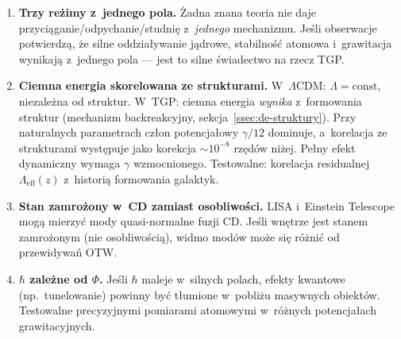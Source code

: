 \medskip
\begin{enumerate}[nosep]
  \item \textbf{Trzy re\.zimy z~jednego pola.}
        \.Zadna znana teoria nie daje
        przyci\k{a}ganie/odpychanie/studni\k{e} z~\emph{jednego}
        mechanizmu. Je\'sli obserwacje potwierdzą, \.ze silne
        oddzia\l{}ywanie j\k{a}drowe, stabilno\'s\'c atomowa
        i~grawitacja wynikaj\k{a} z~jednego pola --- jest to
        silne \'swiadectwo na rzecz TGP.

  \item \textbf{Ciemna energia skorelowana ze strukturami.}
        W~$\Lambda$CDM: $\Lambda = \mathrm{const}$, niezale\.zna
        od struktur. W~TGP: ciemna energia \emph{wynika}
        z~formowania struktur (mechanizm backreakcyjny,
        sekcja~\ref{ssec:de-struktury}). Przy naturalnych parametrach
        cz\l{}on potencja\l{}owy $\gamma/12$ dominuje, a~korelacja
        ze strukturami wyst\k{e}puje jako korekcja
        $\sim 10^{-8}$ rz\k{e}d\'ow ni\.zej. Pe\l{}ny efekt
        dynamiczny wymaga $\gamma$ wzmocnionego.
        Testowalne: korelacja residualnej
        $\Lambda_{\mathrm{eff}}(z)$ z~histori\k{a} formowania
        galaktyk.

  \item \textbf{Stan zamro\.zony w~CD zamiast osobliwo\'sci.}
        LISA i~Einstein Telescope mog\k{a} mierzy\'c mody
        quasi-normalne fuzji CD. Je\'sli wn\k{e}trze jest
        stanem zamro\.zonym (nie osobliwo\'sci\k{a}), widmo
        mod\'ow mo\.ze si\k{e} r\'o\.zni\'c od przewidywa\'n OTW.

  \item \textbf{$\hbar$ zale\.zne od $\Phi$.}
        Je\'sli $\hbar$ maleje w~silnych polach, efekty kwantowe
        (np.\ tunelowanie) powinny by\'c t\l{}umione w~pobli\.zu
        masywnych obiekt\'ow. Testowalne precyzyjnymi
        pomiarami atomowymi w~r\'o\.znych potencja\l{}ach
        grawitacyjnych.


\end{enumerate}
